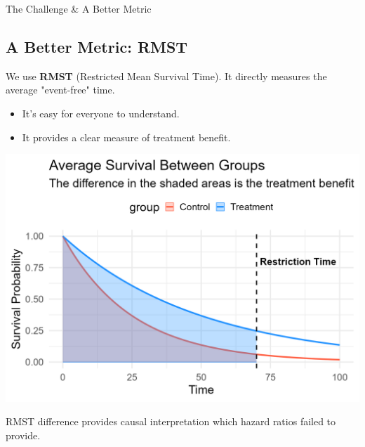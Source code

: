 \documentclass[a0,landscape]{a0poster}
\begin{document}
\begin{minipage}[t]{0.32\linewidth}
\begin{posterbox}{The Challenge \& A Better Metric}
    \subsection*{\Large A Better Metric: RMST}
    \large 
    We use \textbf{RMST} (Restricted Mean Survival Time). It directly measures the average "event-free" time.
    \begin{itemize} \itemsep=0.25em
        \item[\Large\checkmark]  It's easy for everyone to understand.
        \item[\Large\checkmark]  It provides a clear measure of treatment benefit.
    \end{itemize}
    \begin{center}
        \includegraphics[width=\linewidth]{rmst_causal_plot.png}
    \end{center}
\large 
RMST difference provides causal interpretation which hazard ratios failed to provide.
\end{posterbox}

\end{minipage}
\hfill %
\end{document}
